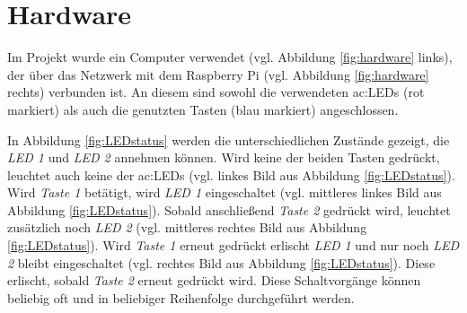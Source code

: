 \section{Hardware}
Im Projekt wurde ein Computer verwendet (vgl. Abbildung \ref{fig:hardware} links), der über das Netzwerk mit dem Raspberry Pi (vgl. Abbildung \ref{fig:hardware} rechts) verbunden ist. An diesem sind sowohl die verwendeten \gls{ac:LED}s (rot markiert) als auch die genutzten Tasten (blau markiert) angeschlossen.
\begin{figure}[H] %
\end{figure} %
\newpage
In Abbildung \ref{fig:LEDstatus} werden die unterschiedlichen Zustände gezeigt, die \textit{LED 1} und \textit{LED 2} annehmen können. Wird keine der beiden Tasten gedrückt, leuchtet auch keine der \gls{ac:LED}s (vgl. linkes Bild aus Abbildung \ref{fig:LEDstatus}). Wird \textit{Taste 1} betätigt, wird \textit{LED 1} eingeschaltet (vgl. mittleres linkes Bild aus Abbildung \ref{fig:LEDstatus}). Sobald anschließend \textit{Taste 2} gedrückt wird, leuchtet zusätzlich noch \textit{LED 2} (vgl. mittleres rechtes Bild aus Abbildung \ref{fig:LEDstatus}). Wird \textit{Taste 1} erneut gedrückt erlischt \textit{LED 1} und nur noch \textit{LED 2} bleibt eingeschaltet (vgl. rechtes Bild aus Abbildung \ref{fig:LEDstatus}). Diese erlischt, sobald \textit{Taste 2} erneut gedrückt wird. Diese Schaltvorgänge können beliebig oft und in beliebiger Reihenfolge durchgeführt werden.

\begin{figure}[H] %
\end{figure} %

